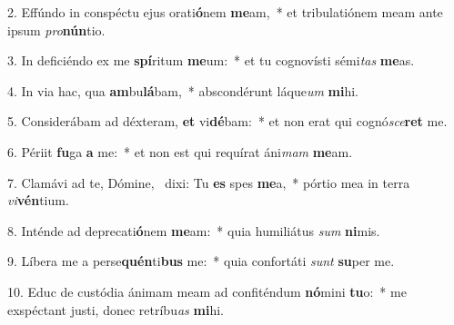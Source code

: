 2. Effúndo in conspéctu ejus orati\textbf{ó}nem \textbf{me}am,~*  et tribulatiónem meam ante ipsum \textit{pro}\textbf{nún}tio.\

3. In deficiéndo ex me \textbf{spí}ritum \textbf{me}um:~*  et tu cognovísti sémi\textit{tas} \textbf{me}as.\

4. In via hac, qua \textbf{am}bu\textbf{lá}bam,~*  abscondérunt láque\textit{um} \textbf{mi}hi.\

5. Considerábam ad déxteram, \textbf{et} vi\textbf{dé}bam:~*  et non erat qui cognó\textit{sce}\textbf{ret} me.\

6. Périit \textbf{fu}ga \textbf{a} me:~*  et non est qui requírat áni\textit{mam} \textbf{me}am.\

7. Clamávi ad te, Dómine, \dag\  dixi: Tu \textbf{es} spes \textbf{me}a,~*  pórtio mea in terra \textit{vi}\textbf{vén}tium.\

8. Inténde ad deprecati\textbf{ó}nem \textbf{me}am:~*  quia humiliátus \textit{sum} \textbf{ni}mis.\

9. Líbera me a perse\textbf{quén}ti\textbf{bus} me:~*  quia confortáti \textit{sunt} \textbf{su}per me.\

10. Educ de custódia ánimam meam ad confiténdum \textbf{nó}mini \textbf{tu}o:~*  me exspéctant justi, donec retríbu\textit{as} \textbf{mi}hi.\

